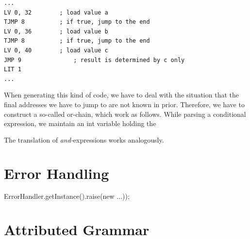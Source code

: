 \documentclass[11pt]{report}
\newcommand{\leongage}{NoBeard}
\newcommand{\alternative}{$\mid \;$}
\newenvironment{atg}[1][6cm]
	{\begin{tabular}[b]{lclp{#1}}}
	{\end{tabular}}
\newcommand{\atgsy}[2]{$\textrm{#1}_\textrm{#2}$}
\newcommand{\outattr}{$\uparrow$}
\newcommand{\inattr}{$\downarrow$}
\newcommand{\semantics}[1]{\textcolor{Gray}{#1}}
\newenvironment {sem}
	{\underline{sem}}
	{\underline{endsem}}
\begin{document}

\begin{lstlisting}[float,caption={Assembler code of or-chain}, captionpos=b,label=cod:orchain]
...
LV 0, 32		; load value a
TJMP 8			; if true, jump to the end
LV 0, 36		; load value b
TJMP 8			; if true, jump to the end
LV 0, 40		; load value c
JMP 9				; result is determined by c only
LIT 1
...
\end{lstlisting}
When generating this kind of code, we have to deal with the situation that the final addresses we have to jump to are not known in prior. Therefore, we have to construct a so-called or-chain, which work as follows. While parsing a conditional expression, we maintain an int variable holding the 

The translation of {\em and-}expressions works analogously.


\chapter{Error Handling}
ErrorHandler.getInstance().raise(new ...));

\chapter{Attributed Grammar}
%
%
\end{document}
